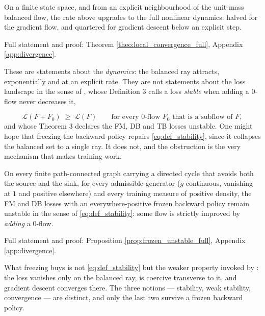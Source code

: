 \begin{theorem}\label{theo:local_convergence}
On a finite state space, and from an explicit neighbourhood of the unit-mass balanced flow,
the rate above upgrades to the full nonlinear dynamics: halved for the gradient flow, and
quartered for gradient descent below an explicit step.
\end{theorem}
Full statement and proof: Theorem \ref{theo:local_convergence_full}, Appendix
\ref{app:divergence}.

These are statements about the \emph{dynamics}: the balanced ray attracts, exponentially and
at an explicit rate. They are not statements about the loss landscape in the sense of
\citet{brunswic2024theory}, whose Definition 3 calls a loss \emph{stable} when adding a
$0$-flow never decreases it,

\begin{equation}\label{eq:def_stability}
    \mathcal L(F+F_0)\;\geq\;\mathcal L(F) \qquad \text{for every $0$-flow $F_0$ that is a subflow of } F,
\end{equation}
and whose Theorem 3 declares the FM, DB and TB losses unstable. One might hope that freezing
the backward policy repairs \eqref{eq:def_stability}, since it collapses the balanced set to a
single ray. It does not, and the obstruction is the very mechanism that makes training work.

\begin{proposition}\label{prop:frozen_unstable}
On every finite path-connected graph carrying a directed cycle that avoids both the source
and the sink, for every admissible generator ($g$ continuous, vanishing at $1$ and positive
elsewhere) and every training measure of positive density, the FM and DB losses with an
everywhere-positive frozen backward policy remain unstable in the sense of
\eqref{eq:def_stability}:
some flow is strictly improved by \emph{adding} a $0$-flow.
\end{proposition}
Full statement and proof: Proposition \ref{prop:frozen_unstable_full}, Appendix
\ref{app:divergence}.

What freezing buys is not
\eqref{eq:def_stability} but the weaker property invoked by \citet{morozov2025revisiting}: the
loss vanishes only on the balanced ray, is coercive transverse to it, and gradient descent
converges there. The three notions --- stability, weak stability, convergence --- are distinct,
and only the last two survive a frozen backward policy.

